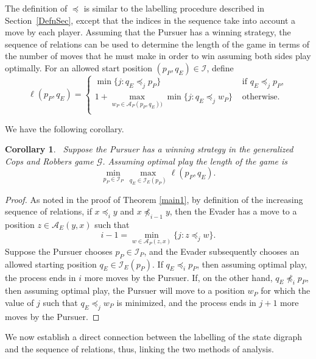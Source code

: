 \documentclass[12pt,reqno]{amsart}
\newtheorem{corollary}[theorem]{Corollary}
\begin{document}
The definition of $\preceq$ is similar to the labelling procedure described in Section~\ref{DefnSec}, except that the indices in the sequence take into account a move by each player. Assuming that
the Pursuer has a winning strategy, the sequence of relations can be used to determine the length of the game in terms of the number of moves that he must make in order to win assuming both sides
play optimally.   For an allowed start position $(p_P, q_E) \in \mathcal{I}$, define
$$\ell(p_P, q_E) =
\begin{cases}
\min\{j: q_E \preceq_j p_P\}& \text{ if } q_E \preceq_j p_P,\\
1 + \max_{w_P \in \mathcal{A}_P(p_P, q_E))} \min\{j: q_E \preceq_j w_P\}&  \text{ otherwise.}\\
\end{cases}
$$

We have the following corollary.
\smallskip
\begin{corollary}~\label{corlength}
Suppose the Pursuer has a winning strategy in the generalized Cops and Robbers game $\mathcal{G}$. Assuming optimal play the length of the game is
$$\min_{p_P \in \mathcal{I}_P}\, \max_{q_E \in \mathcal{I}_E(p_P)}  \ell(p_P, q_E).$$
\end{corollary}
\begin{proof}
 As noted in the proof of Theorem \ref{main1}, by definition of the increasing sequence of relations, if $x \preceq_i y$ and $x \not\preceq_{i-1} y$, then the Evader has a move to a position $z \in
\mathcal{A}_E(y, x)$ such that $$i-1 = \min_{w \in \mathcal{A}_P(z, x)} \{j: z \preceq_j w\}.$$  Suppose the Pursuer chooses $p_P \in \mathcal{I}_P$, and the Evader subsequently chooses an allowed
starting position $q_E \in \mathcal{I}_E(p_P)$.  If $q_E \preceq_i p_P$, then assuming optimal play, the process ends in $i$ more moves by the Pursuer.  If, on the other hand, $q_E \not\preceq_i
p_P$, then assuming optimal play, the Pursuer will move to a position $w_P$ for which the value of $j$ such that $q_E \preceq_j w_P$ is minimized, and the process ends in $j+1$ more moves by the
Pursuer.
\end{proof}

We now establish a direct connection between the labelling of the state digraph and the sequence of relations, thus, linking the two methods of analysis.
\end{document}
